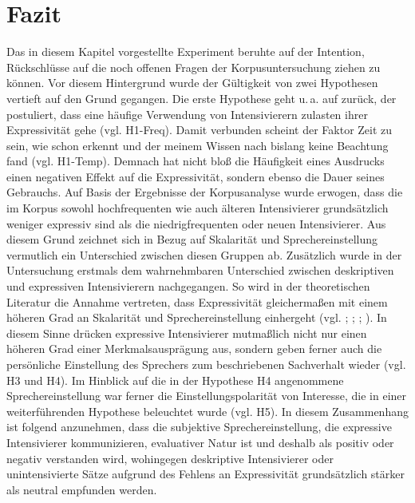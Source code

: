 %
\section{Fazit}\label{abs:Fazit835}
Das in diesem Kapitel vorgestellte Experiment beruhte auf der Intention, Rückschlüsse auf die noch offenen Fragen der Korpusuntersuchung ziehen zu können. Vor diesem Hintergrund wurde der Gültigkeit von zwei Hypothesen vertieft auf den Grund gegangen. Die erste Hypothese geht u.\,a. auf {\citet[2]{Hauschild.1899}} zurück, der postuliert, dass eine häufige Verwendung von Intensivierern zulasten ihrer Expressivität gehe {(vgl. H1-Freq)}. Damit verbunden scheint der Faktor Zeit zu sein, wie schon {\citet[59]{Tobler.1868}} erkennt und der meinem Wissen nach bislang keine Beachtung fand ({vgl. H1-Temp)}. Demnach hat nicht bloß die Häufigkeit eines Ausdrucks einen negativen Effekt auf die Expressivität, sondern ebenso die Dauer seines Gebrauchs. Auf Basis der Ergebnisse der Korpusanalyse wurde erwogen, dass die im Korpus sowohl hochfrequenten wie auch älteren Intensivierer grundsätzlich weniger expressiv sind als die niedrigfrequenten oder neuen Intensivierer. Aus diesem Grund zeichnet sich in Bezug auf Skalarität und Sprechereinstellung vermutlich ein Unterschied zwischen diesen Gruppen ab. Zusätzlich wurde in der Untersuchung erstmals dem wahrnehmbaren Unterschied zwischen deskriptiven und expressiven Intensivierern nachgegangen. So wird in der theoretischen Literatur die Annahme vertreten, dass Expressivität gleichermaßen mit einem höheren Grad an Skalarität und Sprechereinstellung einhergeht (vgl. \citealt[315]{Lang.1983}; \citealt[22]{Paradis.1997}; \citealt[57]{Ortner.2014}; \citealt[133]{Gutzmann.2019a}). In diesem Sinne drücken expressive Intensivierer mutmaßlich nicht nur einen höheren Grad einer Merkmalsausprägung aus, sondern geben ferner auch die persönliche Einstellung des Sprechers zum beschriebenen Sachverhalt wieder (vgl. H3 und H4). Im Hinblick auf die in der Hypothese H4 angenommene Sprechereinstellung war ferner die Einstellungspolarität von Interesse, die in einer weiterführenden Hypothese beleuchtet wurde (vgl. H5). In diesem Zusammenhang ist {\citet[135]{Gutzmann.2019a}} folgend anzunehmen, dass die subjektive Sprechereinstellung, die expressive Intensivierer kommunizieren, evaluativer Natur ist und deshalb als positiv oder negativ verstanden wird, wohingegen deskriptive Intensivierer oder unintensivierte Sätze aufgrund des Fehlens an Expressivität grundsätzlich stärker als neutral empfunden werden.





